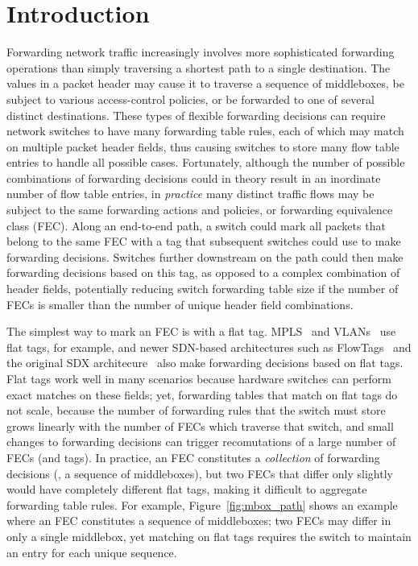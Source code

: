 \section{Introduction}
\label{sec:intro}

Forwarding network traffic increasingly involves more sophisticated
forwarding operations than simply traversing a shortest path to a single
destination.  The values in a packet header may cause it to traverse a
sequence of middleboxes, be subject to various access-control policies,
or be forwarded to one of several distinct destinations. These types of
flexible forwarding decisions can require network switches to have many
forwarding table rules, each of which may match on multiple packet
header fields, thus causing switches to store many flow table entries to
handle all possible cases. Fortunately, although the number of possible
combinations of forwarding decisions could in theory result in an
inordinate number of flow table entries, in {\em practice} many distinct
traffic flows may be subject to the same forwarding actions and
policies, or {forwarding equivalence class} (FEC). Along an end-to-end
path, a switch could mark all packets that belong to the same FEC with a
tag that subsequent switches could use to make forwarding
decisions. Switches further downstream on the path could then make
forwarding decisions based on this tag, as opposed to a complex
combination of header fields, potentially reducing switch forwarding
table size if the number of FECs is smaller than the number of unique
header field combinations.

The simplest way to mark an FEC is with a flat tag.  MPLS~\cite{mpls}
and VLANs~\cite{vlan} use flat tags, for example, and newer SDN-based
architectures such as FlowTags~\cite{flowtags} and the original SDX
architecure~\cite{sdx} also make forwarding decisions based on flat
tags.  Flat tags work well in many scenarios because hardware switches
can perform exact matches on these fields; yet, forwarding tables that
match on flat tags do not scale, because the number of forwarding rules
that the switch must store grows linearly with the number of FECs which
traverse that switch, and small changes to forwarding decisions can
trigger recomutations of a large number of FECs (and tags).
In practice, an FEC constitutes a \emph{collection} of forwarding
decisions (\eg, a sequence of middleboxes), but two FECs that differ
only slightly would have completely different flat tags, making it
difficult to aggregate forwarding table rules.  For example,
Figure~\ref{fig:mbox_path} shows an example where an FEC constitutes a
sequence of middleboxes; two FECs may differ in only a single middlebox,
yet matching on flat tags requires the switch to maintain an entry for
each unique sequence. 

